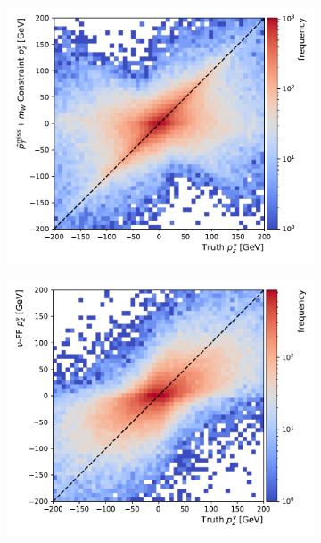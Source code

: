 \begin{figure}[ht]
    \centering
    \begin{subfigure}{0.40\textwidth}
        \includegraphics[width=\textwidth]{Figures/neutrino_unfolding/p_z_quad.pdf}
        \caption{} \label{fig:px_dist}
    \end{subfigure}
    \begin{subfigure}{0.40\textwidth}
        \includegraphics[width=\textwidth]{Figures/neutrino_unfolding/p_z_ff.pdf}
        \caption{} \label{fig:py_dist}
    \end{subfigure}\\

\end{figure}
